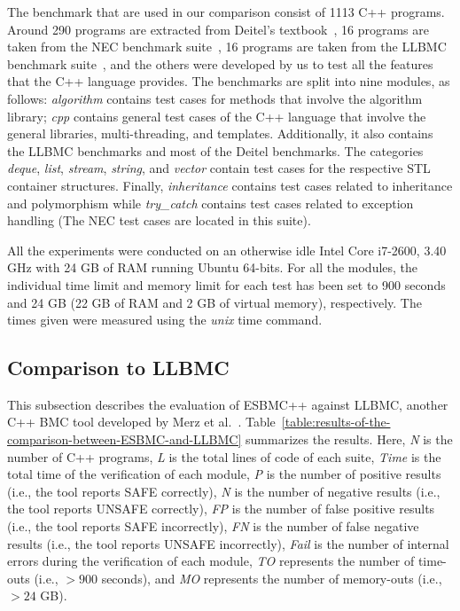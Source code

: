 \documentclass[a4paper]{llncs}
\begin{document}
The benchmark that are used in our comparison consist of 1113 C++ programs.
Around 290 programs are extracted from Deitel's textbook~\cite{Deitel},
16 programs are taken from the NEC benchmark suite~\cite{NeclabsBenchmarkExceptions},
16 programs are taken from the LLBMC benchmark suite~\cite{PrabhuMBIG11},
and the others were developed by us to test all the features that the C++ language
provides. The benchmarks are split into nine modules, as follows:
\textit{algorithm} contains test cases for methods that involve the
algorithm library; \textit{cpp} contains general test cases of the C++
language that involve the general libraries, multi-threading, and templates.
Additionally, it also contains the LLBMC benchmarks and most of the Deitel
benchmarks. The categories \textit{deque}, \textit{list},
\textit{stream}, \textit{string}, and \textit{vector} contain test cases
for the respective STL container structures.
Finally, \textit{inheritance} contains test cases related to inheritance and
polymorphism while \textit{try\_catch} contains test cases related to exception handling
(The NEC test cases are located in this suite).

All the experiments were conducted on an otherwise idle Intel Core i7-2600,
3.40 GHz with 24 GB of RAM running Ubuntu 64-bits. For all the modules,
the individual time limit and memory limit for each test has been set to 900 seconds
and 24 GB (22 GB of RAM and 2 GB of virtual memory), respectively.
The times given were measured using the \textit{unix} time command.

\subsection{Comparison to LLBMC}
\label{comparison-to-LLBMC}

This subsection describes the evaluation of ESBMC++
against LLBMC, another C++ BMC tool developed by Merz et al.~\cite{Florian12}.
Table~\ref{table:results-of-the-comparison-between-ESBMC-and-LLBMC}
summarizes the results. Here, \textit{N} is the number of C++ programs,
\textit{L} is the total lines of code of each suite, \textit{Time} is the
total time of the verification of each module, \textit{P} is the
number of positive results (i.e., the tool reports SAFE correctly), 
\textit{N} is the number of negative results (i.e., the tool reports 
UNSAFE correctly), \textit{FP} is the number of false positive
results (i.e., the tool reports SAFE incorrectly), \textit{FN} is the number
of false negative results (i.e., the tool reports UNSAFE incorrectly), \textit{Fail}
is the number of internal errors during the verification of each module,
\textit{TO} represents the number of time-outs (i.e., $>900$ seconds),
and \textit{MO} represents the number of memory-outs (i.e., $>24$ GB).
\end{document}
